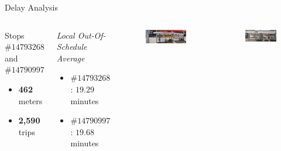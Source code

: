 \documentclass[xcolor=dvipsnames,table]{beamer}
\begin{document}
\begin{frame}{Delay Analysis}
        \begin{columns}
        \begin{block}{Stops $\#14793268$ and $\#14790997$} 
                \begin{itemize}
                        \item \textbf{462} meters 
                        \item \textbf{2,590} trips 
                \end{itemize}
        \end{block}
        \begin{block}{\textit{Local Out-Of-Schedule Average}} 
                \begin{itemize}
                        \item $\#14793268$: $19.29$ minutes 
                        \item $\#14790997$: $19.68$ minutes 
                \end{itemize}
        \end{block}
                \begin{figure}[t]
                        \centering
                        \includegraphics[width=\linewidth]{images/bustop1_pedroii.png}
                \end{figure}
                \begin{figure}[t]
                        \centering
                        \includegraphics[width=\linewidth]{images/bustop2_pedroii.png}
                \end{figure}
        \end{columns}
\end{frame}
\end{document}
